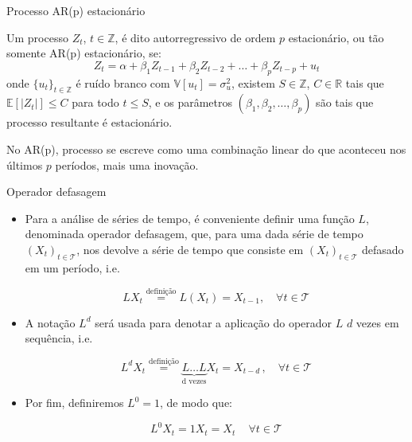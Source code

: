 \documentclass[11pt]{beamer}
\newenvironment{halfwideitemize}{\itemize\addtolength{\itemsep}{0.5em}}{\enditemize}
\begin{document}
	
	
		\begin{frame}{Processo AR(p) estacionário}
		\begin{halfwideitemize}
				\item Um processo $Z_t$, $t \in \mathbb{Z}$, é dito autorregressivo de ordem $p$ estacionário, ou tão somente AR(p) estacionário, se:
			\begin{equation*}
				Z_t = \alpha + \beta_1 Z_{t-1} + \beta_2 Z_{t-2}+\ldots + \beta_p Z_{t-p}+ u_t
			\end{equation*} 
			onde  $\{u_t\}_{t \in \mathbb{Z}}$ é ruído branco com $\mathbb{V}[u_t] = \sigma^2_u$, existem $S \in \mathbb{Z}$, $C \in \mathbb{R}$  tais que $\mathbb{E}[|Z_t|] \leq C$ para todo $t \leq S$, e {\color{red}os parâmetros $(\beta_1,\beta_2,\ldots, \beta_p)$ são tais que processo resultante é estacionário}.
			\item No AR(p), processo se escreve como uma combinação linear do que aconteceu nos últimos $p$ períodos, mais uma inovação.
		\end{halfwideitemize}
	\end{frame}
	
	
	\begin{frame}{Operador defasagem}
		\begin{itemize}
			\item Para a análise de séries de tempo, é conveniente definir uma função $L$, denominada operador defasagem, que, para uma dada série de tempo $(X_t)_{t \in \mathcal{T}}$, nos devolve a série de tempo que consiste em  $(X_t)_{t \in \mathcal{T}}$ defasado em um período, i.e.
			
			$$L X_t \overset{\text{definição}}{=} L(X_t) = X_{t-1}, \quad \forall t \in \mathcal{T}$$
			\item A notação $L^d$ será usada para denotar a aplicação do operador $L$ $d$ vezes em sequência, i.e.
			
			$$L^d X_t \overset{\text{definição}}{=} \underbrace{L\ldots L}_{\text{d vezes}} X_t = X_{t-d}\, , \quad \forall t \in \mathcal{T}$$
			\item Por fim, definiremos $L^0 = 1$, de modo que:
			
			$$L^0 X_t = 1 X_t = X_t\, \quad \forall t \in \mathcal{T}$$
		\end{itemize}
	\end{frame}
	
\end{document}
